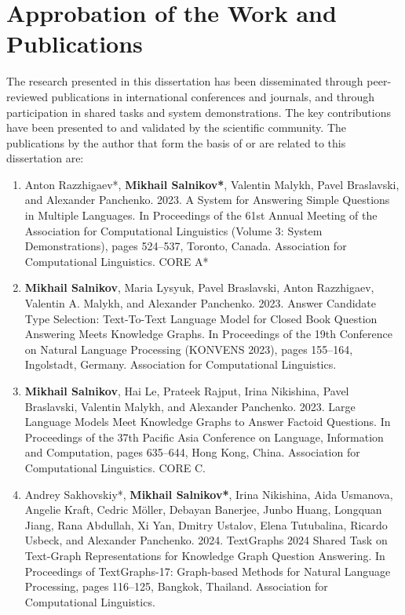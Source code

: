 \section*{Approbation of the Work and Publications}
\label{sec:synopsis:approbation}
The research presented in this dissertation has been disseminated through peer-reviewed publications in international conferences and journals, and through participation in shared tasks and system demonstrations. The key contributions have been presented to and validated by the scientific community.
The publications by the author that form the basis of or are related to this dissertation are:
\begin{enumerate}
    \item Anton Razzhigaev*, \textbf{Mikhail Salnikov*}, Valentin Malykh, Pavel Braslavski, and Alexander Panchenko. 2023. A System for Answering Simple Questions in Multiple Languages. In Proceedings of the 61st Annual Meeting of the Association for Computational Linguistics (Volume 3: System Demonstrations), pages 524–537, Toronto, Canada. Association for Computational Linguistics. CORE A*
    \item \textbf{Mikhail Salnikov}, Maria Lysyuk, Pavel Braslavski, Anton Razzhigaev, Valentin A. Malykh, and Alexander Panchenko. 2023. Answer Candidate Type Selection: Text-To-Text Language Model for Closed Book Question Answering Meets Knowledge Graphs. In Proceedings of the 19th Conference on Natural Language Processing (KONVENS 2023), pages 155–164, Ingolstadt, Germany. Association for Computational Linguistics. 
    \item \textbf{Mikhail Salnikov}, Hai Le, Prateek Rajput, Irina Nikishina, Pavel Braslavski, Valentin Malykh, and Alexander Panchenko. 2023. Large Language Models Meet Knowledge Graphs to Answer Factoid Questions. In Proceedings of the 37th Pacific Asia Conference on Language, Information and Computation, pages 635–644, Hong Kong, China. Association for Computational Linguistics. CORE C.
    \item Andrey Sakhovskiy*, \textbf{Mikhail Salnikov*}, Irina Nikishina, Aida Usmanova, Angelie Kraft, Cedric Möller, Debayan Banerjee, Junbo Huang, Longquan Jiang, Rana Abdullah, Xi Yan, Dmitry Ustalov, Elena Tutubalina, Ricardo Usbeck, and Alexander Panchenko. 2024. TextGraphs 2024 Shared Task on Text-Graph Representations for Knowledge Graph Question Answering. In Proceedings of TextGraphs-17: Graph-based Methods for Natural Language Processing, pages 116–125, Bangkok, Thailand. Association for Computational Linguistics.

\end{enumerate}

